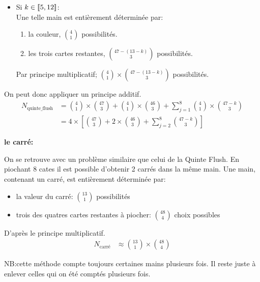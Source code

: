 \documentclass[10pt]{report}
\begin{document}
\begin{description}
\begin{itemize}
            \item Si $k \in [\![5, \space 12]\!]$: \\
            Une telle main est entièrement déterminée par:
            \begin{enumerate}
                \item la couleur, \(\binom{4}{1}\) possibilités.
                \item les trois cartes restantes, \(\binom{47 - (13 -k)}{3}\) 
                possibilités.
            \end{enumerate}
            Par principe multiplicatif; 
            $\binom{4}{1} \times \binom{47 - (13-k)}{3}$ possibilités.

        \end{itemize}
        
        On peut donc appliquer un principe additif.
        \begin{align*}
            N_\text{quinte\_flush} &= \binom{4}{1} \times \binom{47}{3} 
            + \binom{4}{1} \times \binom{46}{3} 
            + \sum_{j=1}^{8}\binom{4}{1} \times \binom{47 - k}{3}  \\
            &= 4 \times \left[\binom{47}{3} + 2 \times \binom{46}{3} 
            + \sum_{j=2}^{8}\binom{47 - k}{3} \right]
        \end{align*}

        \item \textbf{le carré:}
        
        On se retrouve avec un problème similaire que celui de la Quinte Flush.
        En piochant 8 cates il est possible d'obtenir 2 carrés dans la même main.
        Une main, contenant un carré, est entièrement déterminée par:

        \begin{itemize}
            \item la valeur du carré: $\binom{13}{1}$ possibilités
            \item trois des quatres cartes restantes à piocher: 
            $\binom{48}{4}$ choix possibles
        \end{itemize}
        D'après le principe multiplicatif.
        \begin{align*}
            N_\text{carré} &\approx \binom{13}{1} \times \binom{48}{4}
        \end{align*}

        NB:\@ cette méthode compte toujours certaines mains plusieurs fois. 
        Il reste juste à enlever celles qui on été comptés plusieurs fois.

    \end{description}
\end{document}
